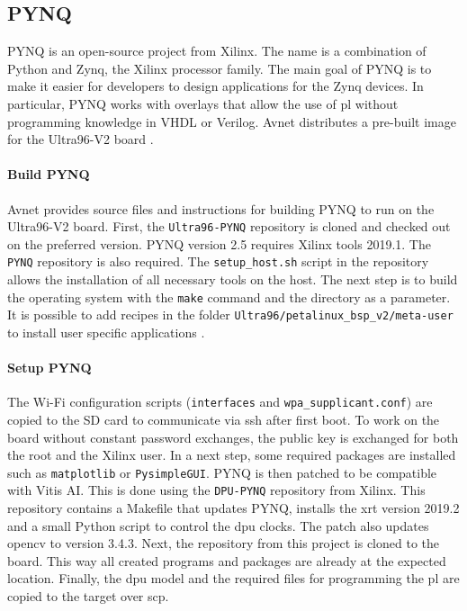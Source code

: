 \subsection{PYNQ}
\label{subsec:embedded_platform:operating_systems:pynq}

PYNQ is an open-source project from Xilinx.
The name is a combination of Python and Zynq, the Xilinx processor family.
The main goal of PYNQ is to make it easier for developers to design applications for the Zynq devices. 
In particular, PYNQ works with overlays that allow the use of \acrlong{pl} without programming knowledge in VHDL or Verilog.
Avnet distributes a pre-built image for the Ultra96-V2 board \cite{pynq_intro}.

\paragraph{Build PYNQ}
Avnet provides source files and instructions for building PYNQ to run on the Ultra96-V2 board.
First, the \texttt{Ultra96-PYNQ} repository is cloned and checked out on the preferred version.
PYNQ version 2.5 requires Xilinx tools 2019.1.
The \texttt{PYNQ} repository is also required.
The \texttt{setup\_host.sh} script in the repository allows the installation of all necessary tools on the host.
The next step is to build the operating system with the \texttt{make} command and the directory as a parameter.
It is possible to add recipes in the folder \texttt{Ultra96/petalinux\_bsp\_v2/meta-user} to install user specific applications \cite{avnet_pynq_github}. 

\paragraph{Setup PYNQ}
The Wi-Fi configuration scripts (\texttt{interfaces} and \texttt{wpa\_supplicant.conf}) are copied to the SD card to communicate via \acrfull{ssh} after first boot.
To work on the board without constant password exchanges, the public key is exchanged for both the root and the Xilinx user.
In a next step, some required packages are installed such as \texttt{matplotlib} or \texttt{PysimpleGUI}.
PYNQ is then patched to be compatible with Vitis AI.
This is done using the \texttt{DPU-PYNQ} repository from Xilinx.
This repository contains a Makefile that updates PYNQ, installs the \acrfull{xrt} version 2019.2 and a small Python script to control the \acrfull{dpu} clocks.
The patch also updates \acrshort{opencv} to version 3.4.3.
Next, the repository from this project is cloned to the board.
This way all created programs and packages are already at the expected location.
Finally, the \acrshort{dpu} model and the required files for programming the \acrfull{pl} are copied to the target over \acrfull{scp}.

